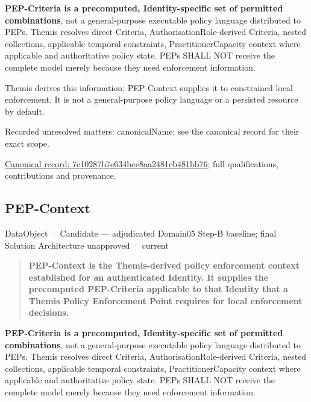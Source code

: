 \textbf{PEP-Criteria is a precomputed, Identity-specific set of permitted combinations},
not a general-purpose executable policy language distributed to PEPs. Themis
resolves direct Criteria, AuthorisationRole-derived Criteria, nested collections,
applicable temporal constraints, PractitionerCapacity context where applicable
and authoritative policy state. PEPs SHALL NOT receive the complete model merely
because they need enforcement information.



Themis derives this information; PEP-Context supplies it to constrained local enforcement. It is not a general-purpose policy language or a persisted resource by default.


{\small Recorded unresolved matters: canonicalName; see the canonical record for their exact scope.}\par
{\footnotesize \href{../../../../continuum/application/data-object/7e10287b7e634bce8aa2481eb481bb76.md}{Canonical record: 7e10287b7e634bce8aa2481eb481bb76}; full qualifications, contributions and provenance.}\par
\subsection{PEP-Context}

\label{element:90c3f7e03448452baec5c425c34fd77a}
{\small DataObject · Candidate — adjudicated Domain05 Step-B baseline; final Solution Architecture unapproved · current}\par

\begin{quote}


\textbf{PEP-Context is the Themis-derived policy enforcement context established for
an authenticated Identity. It supplies the precomputed PEP-Criteria applicable
to that Identity that a Themis Policy Enforcement Point requires for local
enforcement decisions.}



\end{quote}


\textbf{PEP-Criteria is a precomputed, Identity-specific set of permitted combinations},
not a general-purpose executable policy language distributed to PEPs. Themis
resolves direct Criteria, AuthorisationRole-derived Criteria, nested collections,
applicable temporal constraints, PractitionerCapacity context where applicable
and authoritative policy state. PEPs SHALL NOT receive the complete model merely
because they need enforcement information.




